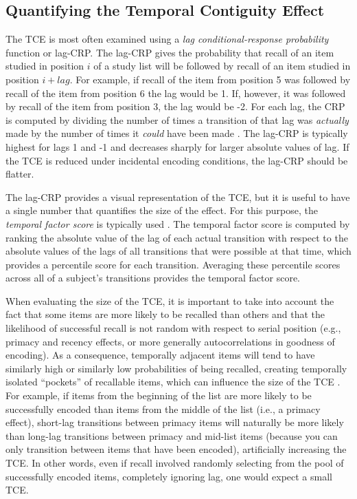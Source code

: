\documentclass[jou,natbib]{apa6} %
\begin{document}
\subsection{Quantifying the Temporal Contiguity Effect} The TCE is most often examined using a \textit{lag conditional-response probability} function or lag-CRP. The lag-CRP gives the probability that recall of an item studied in position $i$ of a study list will be followed by recall of an item studied in position $i+lag$. For example, if recall of the item from position 5 was followed by recall of the item from position 6 the lag would be 1. If, however, it was followed by recall of the item from position 3, the lag would be -2. For each lag, the CRP is computed by dividing the number of times a transition of that lag was \emph{actually} made by the number of times it \emph{could} have been made \citep[e.g., it could not have been made if the item $i+lag$ was already recalled;][]{Kaha96}. The lag-CRP is typically highest for lags 1 and -1 and decreases sharply for larger absolute values of lag. If the TCE is reduced under incidental encoding conditions, the lag-CRP should be flatter.

The lag-CRP provides a visual representation of the TCE, but it is useful to have a single number that quantifies the size of the effect. For this purpose, the \emph{temporal factor score} is typically used \citep{SedeEtal10,PolyEtal09}. The temporal factor score is computed by ranking the absolute value of the lag of each actual transition with respect to the absolute values of the lags of all transitions that were possible at that time, which provides a percentile score for each transition. Averaging these percentile scores across all of a subject's transitions provides the temporal factor score.
 
When evaluating the size of the TCE, it is important to take into account the fact that some items are more likely to be recalled than others and that the likelihood of successful recall is not random with respect to serial position (e.g., primacy and recency effects, or more generally autocorrelations in goodness of encoding). As a consequence, temporally adjacent items will tend to have similarly high or similarly low probabilities of being recalled, creating temporally isolated ``pockets'' of recallable items, which can influence the size of the TCE \citep{Hint16,SedeEtal10}. For example, if items from the beginning of the list are more likely to be successfully encoded than items from the middle of the list (i.e., a primacy effect), short-lag transitions between primacy items will naturally be more likely than long-lag transitions between primacy and mid-list items (because you can only transition between items that have been encoded), artificially increasing the TCE. In other words, even if recall involved randomly selecting from the pool of successfully encoded items, completely ignoring lag, one would expect a small TCE.
\end{document}
